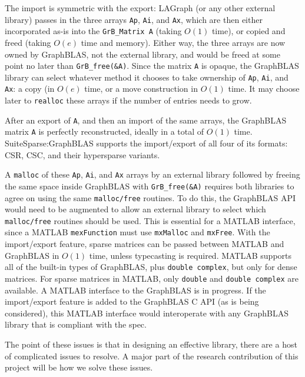 The import is symmetric with the export:  LAGraph (or any other external
library) passes in the three arrays \verb'Ap', \verb'Ai', and \verb'Ax', which
are then either incorporated as-is into the \verb'GrB_Matrix A' (taking $O(1)$
time), or copied and freed (taking $O(e)$ time and memory).  Either way, the
three arrays are now owned by GraphBLAS, not the external library, and would be
freed at some point no later than \verb'GrB_free(&A)'.  Since the matrix
\verb'A' is opaque, the GraphBLAS library can select whatever method it chooses
to take ownership of \verb'Ap', \verb'Ai', and \verb'Ax': a copy (in $O(e)$
time, or a move construction in $O(1)$ time.  It may choose later to
\verb'realloc' these arrays if the number of entries needs to grow.

After an export of \verb'A', and then an import of the same arrays, the
GraphBLAS matrix \verb'A' is perfectly reconstructed, ideally in a total of
$O(1)$ time.  SuiteSparse:GraphBLAS supports the import/export of all four of
its formats: CSR, CSC, and their hypersparse variants.

A \verb'malloc' of these \verb'Ap', \verb'Ai', and \verb'Ax' arrays by an
external library followed by freeing the same space inside GraphBLAS with
\verb'GrB_free(&A)' requires both libraries to agree on using the same
\verb'malloc/free' routines.  To do this, the GraphBLAS API would need to be
augmented to allow an external library to select which \verb'malloc/free'
routines should be used.  This is essential for a MATLAB interface,
since a MATLAB \verb'mexFunction' must use \verb'mxMalloc' and \verb'mxFree'.
With the import/export feature, sparse matrices can be passed between MATLAB
and GraphBLAS in $O(1)$ time, unless typecasting is required. MATLAB supports
all of the built-in types of GraphBLAS, plus \verb'double complex', but only
for dense matrices.  For sparse matrices in MATLAB, only \verb'double' and
\verb'double complex' are available.  A MATLAB interface to the GraphBLAS is in
progress.  If the import/export feature is added to the GraphBLAS C API (as is
being considered), this MATLAB interface would interoperate with any GraphBLAS
library that is compliant with the spec.

The point of these issues is that in designing an effective library, there are a host of 
complicated issues to resolve.  A major part of the research contribution of this project will
be how we solve these issues.

